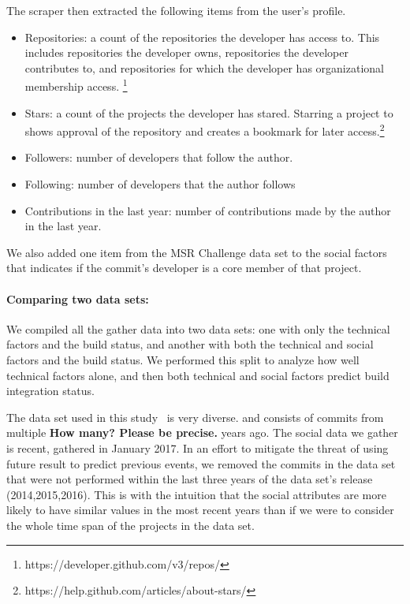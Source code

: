 \documentclass[10pt, conference]{IEEEtran}
\newcommand{\todo}[1]
  {{\scriptsize \textbf{\color{red} {#1}}}}
\begin{document}
The scraper then extracted the following items from the user's
profile.

\begin{itemize}
\item Repositories: a count of the repositories the developer has access to. This 
includes repositories the developer owns, repositories the developer contributes
to, and repositories for which the developer has organizational membership access.
\footnote{https://developer.github.com/v3/repos/}
\item Stars: a count of the projects the developer has stared. Starring a project
to shows approval of the repository and creates  a bookmark for later 
access.\footnote{https://help.github.com/articles/about-stars/}
\item Followers: number of developers that follow the author. 
\item Following: number of developers that the author follows 
\item Contributions in the last year: number of contributions made by the author in the last year.
\end{itemize}


We also added one item from the MSR Challenge data set to the social factors that indicates if the commit's developer is a core member 
of that project.

\paragraph{Comparing two data sets:} We compiled all the gather data into 
two data sets: one with only the technical
factors and the build status, and another with both the technical and social
factors and the build status. We performed this split to analyze how well technical factors alone,
and then both technical and social
factors predict build integration status.

The data set used in this study~\cite{msr17challenge} is very diverse.
and consists of commits from multiple\todo{How many? Please be precise.} years ago. The social data we 
gather is recent, gathered in January 2017. In an effort to mitigate the threat of
using future result to predict previous events,
we removed the commits in the data set that were not performed within the last
three years of the data set's release (2014,2015,2016).  This is with the intuition that the social attributes are more likely to have similar values in the most recent years than if we were to consider the whole time span of the projects in the data set.
\end{document}
